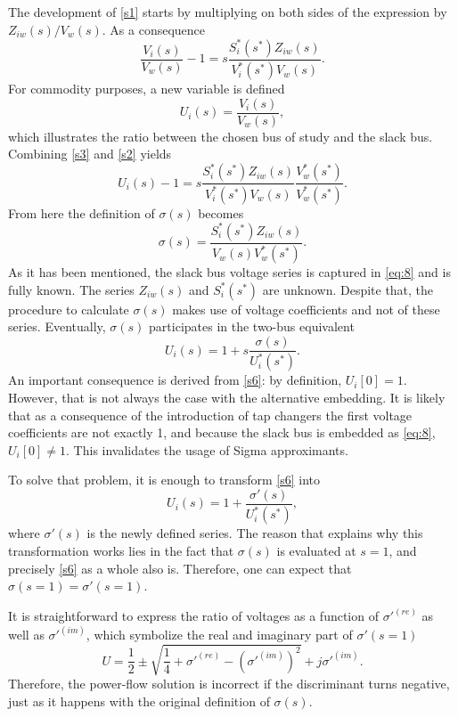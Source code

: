 \documentclass[journal]{IEEEtran}
\begin{document}
The development of \eqref{s1} starts by multiplying on both sides of the expression by $Z_{iw}(s)/V_w(s)$. As a consequence
\begin{equation}
  \frac{V_i(s)}{V_w(s)}-1=s\frac{S^*_i(s^*)Z_{iw}(s)}{V^*_i(s^*)V_w(s)}.
  \label{s2}
\end{equation}
For commodity purposes, a new variable is defined
\begin{equation}
  U_i(s)=\frac{V_i(s)}{V_w(s)},
  \label{s3}
\end{equation}
which illustrates the ratio between the chosen bus of study and the slack bus. Combining \eqref{s3} and \eqref{s2} yields
\begin{equation}
  U_i(s)-1=s\frac{S^*_i(s^*)Z_{iw}(s)}{V^*_i(s^*)V_w(s)}\frac{V^*_w(s^*)}{V^*_w(s^*)}.
  \label{s4}
\end{equation}
From here the definition of $\sigma(s)$ becomes
\begin{equation}
  \sigma(s)=\frac{S^*_i(s^*)Z_{iw}(s)}{V_w(s)V^*_w(s^*)}.
  \label{s5}
\end{equation}
As it has been mentioned, the slack bus voltage series is captured in \eqref{eq:8} and is fully known. The series $Z_{iw}(s)$ and $S^*_i(s^*)$ are unknown. Despite that, the procedure to calculate $\sigma(s)$ makes use of voltage coefficients and not of these series. Eventually, $\sigma(s)$ participates in the two-bus equivalent
\begin{equation}
  U_i(s)=1+s\frac{\sigma(s)}{U^*_i(s^*)}.
  \label{s6}
\end{equation}
An important consequence is derived from \eqref{s6}: by definition, $U_i[0]=1$. However, that is not always the case with the alternative embedding. It is likely that as a consequence of the introduction of tap changers the first voltage coefficients are not exactly 1, and because the slack bus is embedded as \eqref{eq:8}, $U_i[0]\neq 1$. This invalidates the usage of Sigma approximants. 

To solve that problem, it is enough to transform \eqref{s6} into
\begin{equation}
  U_i(s)=1+\frac{\sigma '(s)}{U^*_i(s^*)},
  \label{s7}
\end{equation}
where $\sigma '(s)$ is the newly defined series. The reason that explains why this transformation works lies in the fact that $\sigma(s)$ is evaluated at $s=1$, and precisely \eqref{s6} as a whole also is. Therefore, one can expect that $\sigma(s=1)=\sigma '(s=1)$.

It is straightforward to express the ratio of voltages as a function of $\sigma '^{(re)}$ as well as $\sigma'^{(im)}$, which symbolize the real and imaginary part of $\sigma '(s=1)$
\begin{equation}
  U=\frac{1}{2}\pm \sqrt{\frac{1}{4} +\sigma'^{(re)} - (\sigma'^{(im)})^2} +j\sigma '^{(im)} .
  \label{s8}
\end{equation} 
Therefore, the power-flow solution is incorrect if the discriminant turns negative, just as it happens with the original definition of $\sigma(s)$.
\end{document}
